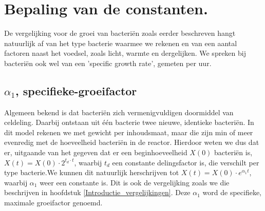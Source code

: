 
%
%

\chapter{Bepaling van de constanten.}
\label{Bepaling van de constanten}

De vergelijking voor de groei van bacteri\"en zoals eerder beschreven hangt natuurlijk af van het type bacterie waarmee we rekenen en van een aantal factoren naast het voedsel, zoals licht, warmte en dergelijken. We spreken bij bacteri\"en ook wel van een 'specific growth rate', gemeten per uur. 

\section{$\alpha_1$, specifieke-groeifactor}
Algemeen bekend is dat bacteri\"en zich vermenigvuldigen doormiddel van celdeling. Daarbij ontstaan uit \'e\'en bacterie twee nieuwe, identieke bacteri\"en. In dit model rekenen we met gewicht per inhoudsmaat, maar die zijn min of meer evenredig met de hoeveelheid bacteri\"en in de reactor. Hierdoor weten we dus dat er, uitgaande van het gegeven dat er een beginhoeveelheid $X(0)$ bacteri\"en is, $X(t) = X(0) \cdot 2^{t_d \cdot t}$, waarbij $t_d$ een constante delingsfactor is, die verschilt per type bacterie.We kunnen dit natuurlijk herschrijven tot $X(t) = X(0) \cdot e^{\alpha_1 t}$, waarbij $\alpha_1$ weer een constante is. Dit is ook de vergelijking zoals we die beschrijven in hoofdstuk \ref{Introductie_vergelijkingen}. Deze $\alpha_1$ word de specifieke, maximale groeifactor genoemd. 

